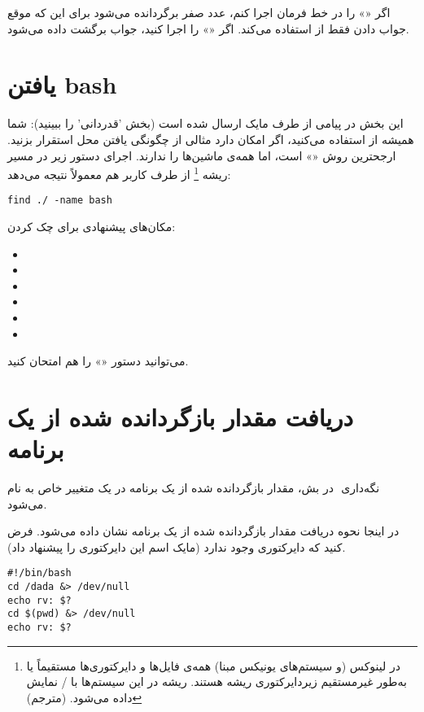 اگر
«»
را در خط فرمان اجرا کنم‌، عدد صفر برگردانده می‌شود برای این که
 موقع جواب دادن فقط از  استفاده می‌کند‌. اگر 
«»
 را اجرا کنید‌، جواب  برگشت داده می‌شود.

\section*{یافتن bash}
این بخش در پیامی از طرف مایک ارسال شده است (بخش 'قدردانی' را ببینید): شما همیشه
از  استفاده می‌کنید، اگر امکان دارد مثالی از چگونگی یافتن محل استقرار
 بزنید‌. ارجحترین روش «» است‌، اما همه‌ی ماشین‌ها  را ندارند‌.
اجرای دستور زیر در مسیر ریشه
\footnote{
در لینوکس (و سیستم‌های یونیکس مبنا) همه‌ی فایل‌ها و دایرکتوری‌ها مستقیماً یا به‌طور
غیرمستقیم زیردایرکتوری ریشه هستند. ریشه در این سیستم‌ها با / نمایش داده می‌شود.
(مترجم)
}
از طرف کاربر  هم معمولاً نتیجه می‌دهد‌:
\begin{latin}
\begin{lstlisting}
find ./ -name bash
\end{lstlisting}
\end{latin}
مکان‌های پیشنهادی برای چک کردن:

\begin{latin}
\begin{itemize}
\item{}
\item{}
\item{}
\item{}
\item{}
\item{}
\end{itemize}
\end{latin}
می‌توانید دستور «» را هم امتحان کنید‌.



\section*{دریافت مقدار بازگردانده شده از یک برنامه}

در بش، مقدار بازگردانده شده از یک برنامه در یک متغییر خاص به نام ‎‎ نگه‌داری می‌شود.

در اینجا نحوه دریافت مقدار بازگردانده شده از یک برنامه نشان داده می‌شود. فرض کنید
که دایرکتوری  وجود ندارد (مایک اسم این دایرکتوری را پیشنهاد داد).
\begin{latin}
\begin{lstlisting}
#!/bin/bash
cd /dada &> /dev/null
echo rv: $?
cd $(pwd) &> /dev/null
echo rv: $?
\end{lstlisting}
\end{latin}

